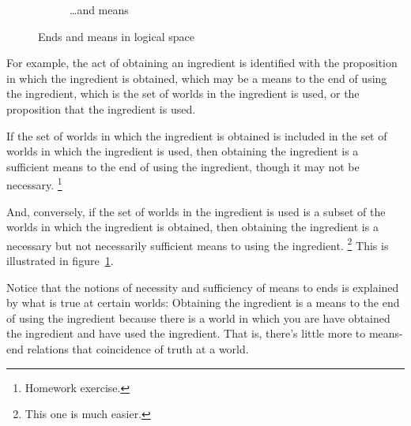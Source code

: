 \documentclass[10pt]{article}
\begin{document}
\begin{figure}[ht]
\begin{subfigure}[h]{0.4\linewidth}
    \caption{\dots and means}
  \end{subfigure}
  \hfill\mbox{}
  \caption{Ends and means in logical space}
  \label{tikz:MEprinciple:setup}
\end{figure}


For example, the act of obtaining an ingredient is identified with the proposition in which the ingredient is obtained, which may be a means to the end of using the ingredient, which is the set of worlds in the ingredient is used, or the proposition that the ingredient is used.

If the set of worlds in which the ingredient is obtained is included in the set of worlds in which the ingredient is used, then obtaining the ingredient is a sufficient means to the end of using the ingredient, though it may not be necessary.\nolinebreak
\footnote{Homework exercise.}

And, conversely, if the set of worlds in the ingredient is used is a subset of the worlds in which the ingredient is obtained, then obtaining the ingredient is a necessary but not necessarily sufficient means to using the ingredient.\nolinebreak
\footnote{This one is much easier.}
This is illustrated in figure~\ref{tikz:MEprinciple:setup}.

Notice that the notions of necessity and sufficiency of means to ends is explained by what is true at certain worlds:
Obtaining the ingredient is a means to the end of using the ingredient because there is a world in which you are have obtained the ingredient and have used the ingredient.
That is, there's little more to means-end relations that coincidence of truth at a world.
\end{document}
